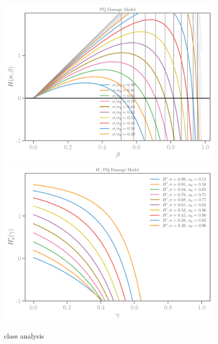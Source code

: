 \documentclass[]{article}
\begin{document}
\begin{figure}[htbp]
  \includegraphics[width=.33\textheight]{../figures/pq-Hbeta.pdf}
  \includegraphics[width=.33\textheight]{../figures/pq-H-prime-beta.pdf}
  \caption{class analysis}
  \label{fig:class-analyser}
\end{figure}
\end{document}
